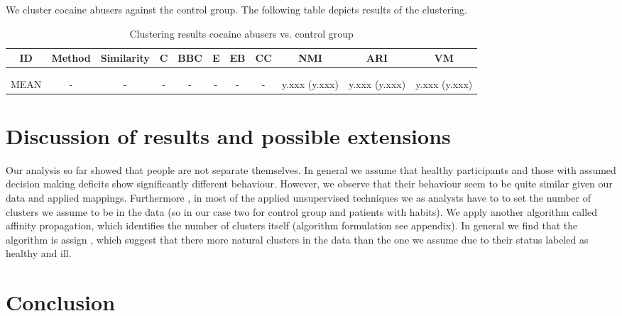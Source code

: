 \documentclass[12pt,a4paper,bibliography=totocnumbered,listof=totocnumbered]{scrartcl}
\begin{document}
We cluster cocaine abusers against the control group. The following table depicts results of the clustering. 

\begin{table}[!htbp] \centering 
	\label{} 
	\tiny
	\begin{tabularx}{\textwidth}{ ccccccccccc} 
		\\\toprule
		ID & Method & Similarity & C & BBC & E & EB & CC & NMI & ARI & VM \\ 
		\hline \\[-1.8ex] 

		\hline \\
		MEAN & - & - & - & - & -  & -  & -  & y.xxx (y.xxx)  & y.xxx (y.xxx)  & y.xxx (y.xxx)  
	\end{tabularx} 
	\caption{Clustering results cocaine abusers vs. control group} 
\end{table} 


\section{Discussion of results and possible extensions }

Our analysis so far showed that people are not separate themselves. In general we assume that healthy participants and those with assumed decision making deficits show significantly different behaviour. However, we observe that their behaviour seem to be quite similar given our data and applied mappings. Furthermore , in most of the applied unsupervised techniques we as analysts have to to set the number of clusters we assume to be in the data (so in our case two for control group and patients with habits). We apply another algorithm called affinity propagation, which identifies the number of clusters itself (algorithm formulation see appendix). In general we find that the algorithm is assign , which suggest that there more natural clusters in the data than the  one we assume due to their status labeled as healthy and ill.


\section{Conclusion}

\pagebreak
\end{document}
